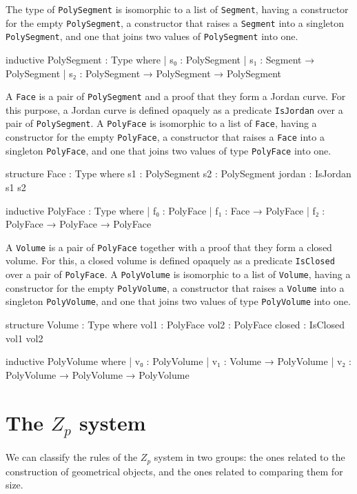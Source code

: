 \documentclass[12pt]{article} %
\newcommand{\leanline}[1]{\texttt{#1}} %
\newcommand{\segment}{\texttt{Segment}} %
\newcommand{\psegment}{\texttt{PolySegment}} %
\newcommand{\face}{\texttt{Face}} %
\newcommand{\pface}{\texttt{PolyFace}} %
\newcommand{\volume}{\texttt{Volume}} %
\newcommand{\pvolume}{\texttt{PolyVolume}} %
\newcommand{\zp}{\ensuremath{Z_{p}}}
\begin{document}
The type of \psegment{} is isomorphic to a list of \segment, having a constructor for the empty \psegment, a constructor that raises a \segment{} into a singleton \psegment, and one that joins two values of \psegment{} into one. %
\begin{leancode}
inductive PolySegment : Type where
| s₀ : PolySegment
| s₁ : Segment → PolySegment
| s₂ : PolySegment → PolySegment → PolySegment
\end{leancode}

A \face{} is a pair of \psegment{} and a proof that they form a Jordan
curve. %
For this purpose, a Jordan curve is defined opaquely as a predicate \leanline{IsJordan} over a pair of \psegment{}. %
A \pface{} is isomorphic to a list of \face, having a constructor for the empty \pface, a constructor that raises a \face{} into a singleton \pface, and one that joins two values of type \pface{} into one. %
\begin{leancode}
structure Face : Type where
  s1 : PolySegment
  s2 : PolySegment
  jordan : IsJordan s1 s2

inductive PolyFace : Type where
| f₀ : PolyFace
| f₁ : Face → PolyFace
| f₂ : PolyFace → PolyFace → PolyFace
\end{leancode}

A \volume{} is a pair of \pface{} together with a proof that they form a
closed volume. %
For this, a closed volume is defined opaquely as a predicate \leanline{IsClosed} over a pair of \pface. %
A \pvolume{} is isomorphic to a list of \volume, having a constructor for the empty \pvolume, a constructor that raises a \volume{} into a singleton \pvolume, and one that joins two values of type \pvolume{} into one. %
\begin{leancode}
structure Volume : Type where
  vol1 : PolyFace
  vol2 : PolyFace
  closed : IsClosed vol1 vol2

inductive PolyVolume where
| v₀ : PolyVolume
| v₁ : Volume → PolyVolume
| v₂ : PolyVolume → PolyVolume → PolyVolume
\end{leancode}

\section{The \zp{} system}\label{sec:zp-system} %

We can classify the rules of the \zp{} system in two groups: the ones related to the construction of geometrical objects, and the ones related to comparing them for size. %
\end{document}
